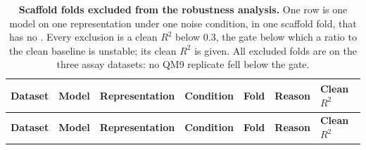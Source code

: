 
{\scriptsize
\begin{longtable}{llllcll}
\caption{\textbf{\SuppFile{} Scaffold folds excluded from the robustness analysis.}
One row is one model on one representation under one noise condition, in one scaffold fold, that has no \aucnorm{}. Every exclusion is a clean $R^2$ below 0.3, the gate below which a ratio to the clean baseline is unstable; its clean $R^2$ is given. All excluded folds are on the three assay datasets: no QM9 replicate fell below the gate.}
\label{supp:excluded_configurations}\\
\toprule
\textbf{Dataset} & \textbf{Model} & \textbf{Representation} & \textbf{Condition} & \textbf{Fold} & \textbf{Reason} & \textbf{Clean $R^2$} \\
\midrule
\endfirsthead
\toprule
\textbf{Dataset} & \textbf{Model} & \textbf{Representation} & \textbf{Condition} & \textbf{Fold} & \textbf{Reason} & \textbf{Clean $R^2$} \\
\midrule
\endhead

\bottomrule
\end{longtable}}
